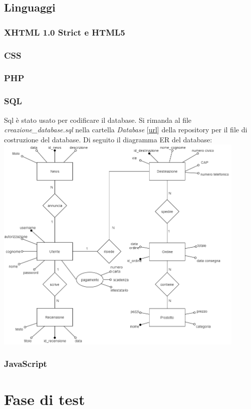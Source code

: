 \documentclass{article}
\begin{document}
		\subsection{Linguaggi}
			\subsubsection{XHTML 1.0 Strict e HTML5}
			\subsubsection{CSS}
			\subsubsection{PHP}
			\subsubsection{SQL}
			Sql è stato usato per codificare il database. Si rimanda al file \textit{creazione\_database.sql} nella cartella \textit{Database} [\href{https://github.com/Mirco469/ProgettoSushi/tree/master/Database}{url}] della repository per il file di costruzione del database. Di seguito il diagramma ER del database:\newline
			\includegraphics[width=12cm]{DiagrammaER.png}
			\subsubsection{JavaScript}
	\section{Fase di test}
\end{document}
